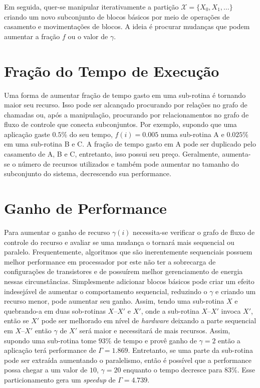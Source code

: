 Em seguida, quer-se manipular iterativamente a partição $ \mathcal{X} = \{ X_0, X_1, ...\} $ criando um novo subconjunto de blocos básicos por meio de operações de casamento e movimentações de blocos. A ideia é procurar mudanças que podem aumentar a fração $ f $ ou o valor de $ \gamma $.

\section{Fração do Tempo de Execução}
Uma forma de aumentar fração de tempo gasto em uma sub-rotina é tornando maior seu recurso. Isso pode ser alcançado procurando por relações no grafo de chamadas ou, após a manipulação, procurando por relacionamentos no grafo de fluxo de controle que conecta subconjuntos. Por exemplo, supondo que uma aplicação gaste $ 0.5 \% $ do seu tempo, $ f(i) = 0.005 $ numa sub-rotina A e $ 0.025\% $ em uma sub-rotina B e C. A fração de tempo gasto em A pode ser duplicado pelo casamento de A, B e C, entretanto, isso possui seu preço. Geralmente, aumenta-se o número de recursos utilizados e também pode aumentar no tamanho do subconjunto do sistema, decrescendo sua performance.

\section{Ganho de Performance}
Para aumentar o ganho de recurso $ \gamma (i) $ necessita-se verificar o grafo de fluxo de controle do recurso e avaliar se uma mudança o tornará mais sequencial ou paralelo. Frequentemente, algoritmos que são inerentemente sequenciais possuem melhor performance em processador por este não ter a sobrecarga de configurações de transistores e de possuírem melhor gerenciamento de energia nessas circunstâncias. Simplesmente adicionar blocos básicos pode criar um efeito indesejável de aumentar o comportamento sequencial, reduzindo o $ \gamma $ e criando um recurso menor, pode aumentar seu ganho. Assim, tendo uma sub-rotina $ X $ e quebrando-a em duas sob-rotinas $ X – X' $ e $ X' $, onde a sub-rotina $ X – X' $ invoca $ X' $, então se $ X' $ pode ser melhorado em nível de \textit{hardware} deixando a parte sequencial em $ X – X' $ então $ \gamma $ de $ X' $ será maior e necessitará de mais recursos. Assim, supondo uma sub-rotina tome $ 93\% $ de tempo e provê ganho de $ \gamma = 2 $ então a aplicação terá performance de $ \Gamma = 1.869 $. Entretanto, se uma parte da sub-rotina pode ser extraída aumentando o paralelismo, então é possível que a performance possa chegar a um valor de $ 10 $, $ \gamma = 20 $ enquanto o tempo decresce para $ 83\% $. Esse particionamento gera um \textit{speedup} de $ \Gamma = 4.739 $.


